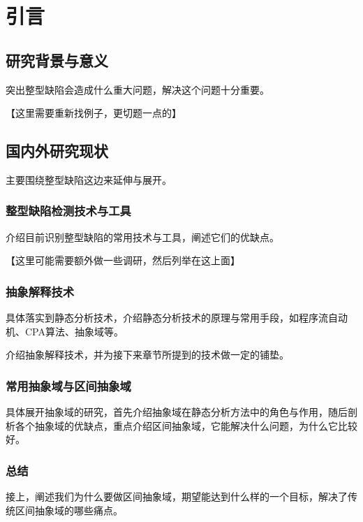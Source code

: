 
\chapter{引言}

 \section{研究背景与意义}
 
 突出整型缺陷会造成什么重大问题，解决这个问题十分重要。
 
 【这里需要重新找例子，更切题一点的】
 
 \section{国内外研究现状}
 
 主要围绕整型缺陷这边来延伸与展开。
 
 \subsection{整型缺陷检测技术与工具}
 
 介绍目前识别整型缺陷的常用技术与工具，阐述它们的优缺点。
 
 【这里可能需要额外做一些调研，然后列举在这上面】
 
 \subsection{抽象解释技术}
 
 具体落实到静态分析技术，介绍静态分析技术的原理与常用手段，如程序流自动机、CPA算法、抽象域等。
 
 介绍抽象解释技术，并为接下来章节所提到的技术做一定的铺垫。
 
 
 \subsection{常用抽象域与区间抽象域}
 
 具体展开抽象域的研究，首先介绍抽象域在静态分析方法中的角色与作用，随后剖析各个抽象域的优缺点，重点介绍区间抽象域，它能解决什么问题，为什么它比较好。
 
 \subsection{总结}
 
 接上，阐述我们为什么要做区间抽象域，期望能达到什么样的一个目标，解决了传统区间抽象域的哪些痛点。
 
